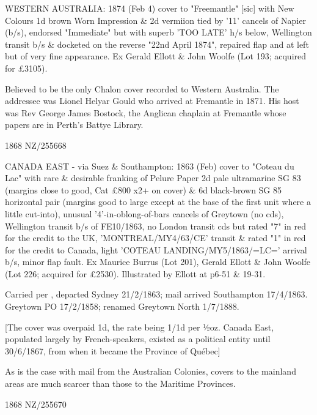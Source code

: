 \documentclass[justified]{tufte-book}
\begin{document}
%
{WESTERN AUSTRALIA: 1874 (Feb 4) cover to "Freemantle" [sic] with New Colours 1d brown Worn Impression \& 2d vermiion tied by '11' cancels of Napier (b/s), endorsed "Immediate" but with superb 'TOO LATE' h/s below, Wellington transit b/s \& docketed on the reverse "22nd April 1874", repaired flap and at left but of very fine appearance. Ex Gerald Ellott \& John Woolfe (Lot 193; acquired for £3105).

Believed to be the only Chalon cover recorded to Western Australia. The addressee was Lionel Helyar Gould who arrived at Fremantle in 1871. His host was Rev George James Bostock, the Anglican chaplain at Fremantle whose papers are in Perth's Battye Library.}%
{1868}%
{NZ/255668}%
{}%
{}
{}%
{}

%
{CANADA EAST - via Suez \& Southampton: 1863 (Feb) cover to "Coteau du Lac" with rare \& desirable franking of Pelure Paper 2d pale ultramarine SG 83 (margins close to good, Cat £800 x2+ on cover) \& 6d black-brown SG 85 horizontal pair (margins good to large except at the base of the first unit where a little cut-into), unusual '4'-in-oblong-of-bars cancels of Greytown (no cds), Wellington transit b/s of FE10/1863, no London transit cds but rated "7" in red for the credit to the UK, 'MONTREAL/MY4/63/CE' transit \& rated "1" in red for the credit to Canada, light 'COTEAU LANDING/MY5/1863/=LC=' arrival b/s, minor flap fault. Ex Maurice Burrus (Lot 201), Gerald Ellott \& John Woolfe (Lot 226; acquired for \pounds{2530}). Illustrated by Ellott at p6-51 \& 19-31. 

Carried per , departed Sydney 21/2/1863; mail arrived Southampton 17/4/1863. Greytown PO 17/2/1858; renamed Greytown North 1/7/1888. 

[The cover was overpaid 1d, the rate being 1/1d per ½oz. Canada East, populated largely by French-speakers, existed as a political entity until 30/6/1867, from when it became the Province of Qu\'ebec] 

As is the case with mail from the Australian Colonies, covers to the mainland areas are much scarcer than those to the Maritime Provinces.}%
{1868}%
{NZ/255670}%
{}%
{}
{}%
{}
%
%
\end{document}
